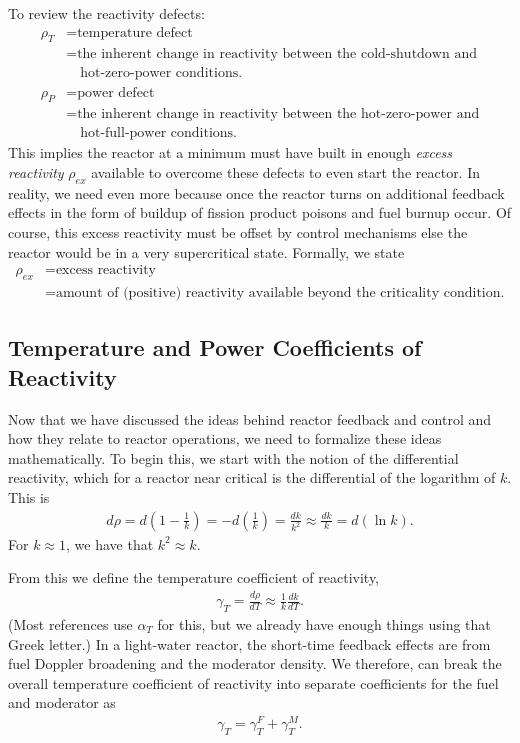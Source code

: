 To review the reactivity defects:
\begin{align}
  \rho_T 
  &= \text{temperature defect} \nonumber \\
  &= \text{the inherent change in reactivity between the cold-shutdown and} \nonumber \\
  &\ \ \ \text{ hot-zero-power conditions.} \nonumber \\
  \rho_P
  &= \text{power defect} \nonumber \\
  &= \text{the inherent change in reactivity between the hot-zero-power and} \nonumber \\
  &\ \ \ \text{ hot-full-power conditions.} \nonumber
\end{align}
This implies the reactor at a minimum must have built in enough \emph{excess reactivity} $\rho_{ex}$ available to overcome these defects to even start the reactor. In reality, we need even more because once the reactor turns on additional feedback effects in the form of buildup of fission product poisons and fuel burnup occur. Of course, this excess reactivity must be offset by control mechanisms else the reactor would be in a very supercritical state. Formally, we state
\begin{align}
  \rho_{ex} 
  &= \text{excess reactivity} \nonumber \\
  &= \text{amount of (positive) reactivity available beyond the criticality condition.} \nonumber
\end{align}

\subsection{Temperature and Power Coefficients of Reactivity}

Now that we have discussed the ideas behind reactor feedback and control and how they relate to reactor operations, we need to formalize these ideas mathematically. To begin this, we start with the notion of the differential reactivity, which for a reactor near critical is the differential of the logarithm of $k$. This is
\begin{align}
  d\rho = d\left( 1 - \frac{1}{k} \right) = -d\left( \frac{1}{k} \right) = \frac{dk}{k^2} \approx \frac{dk}{k} = d(\ln k).
\end{align}
For $k \approx 1$, we have that $k^2 \approx k$.

From this we define the temperature coefficient of reactivity,
\begin{align}
  \gamma_T = \frac{d\rho}{dT} \approx \frac{1}{k} \frac{dk}{dT} .
\end{align}
(Most references use $\alpha_T$ for this, but we already have enough things using that Greek letter.) In a light-water reactor, the short-time feedback effects are from fuel Doppler broadening and the moderator density. We therefore, can break the overall temperature coefficient of reactivity into separate coefficients for the fuel and moderator as
\begin{align}
  \gamma_T = \gamma_T^F + \gamma_T^M .
\end{align}

